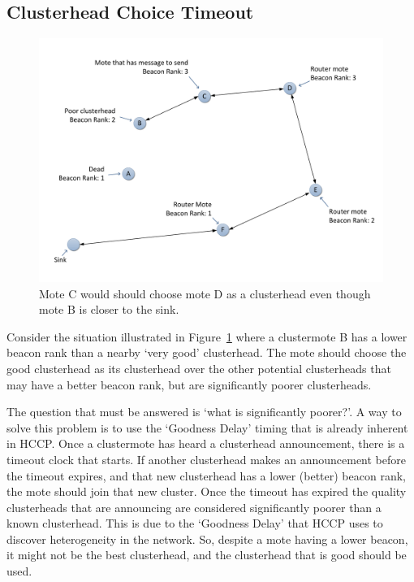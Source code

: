 \subsection{Clusterhead Choice Timeout}
\begin{figure}[tb]
	\centering
		\includegraphics[width=\textwidth]{images/clusterheadChoice/BetterChooseWorseSometimes.pdf}
	\caption{Mote C would should choose mote D as a clusterhead even though mote B is closer to the sink. }
	\label{fig:image_chooseWorse}
\end{figure}



Consider the situation illustrated in Figure~\ref{fig:image_chooseWorse} where a clustermote B has a lower beacon rank than a nearby `very good' clusterhead.
The mote should choose the good clusterhead as its clusterhead over the other potential clusterheads
that may have a better beacon rank, but are significantly poorer clusterheads. 

The question that must be answered is `what is significantly poorer?'. A way to solve this problem is to use
the `Goodness Delay' timing that is already inherent in HCCP. Once a clustermote has heard a clusterhead announcement, there is a
timeout clock that starts. If another clusterhead makes an announcement before the timeout expires, and that new clusterhead 
has a lower (better) beacon rank, the mote should join that new cluster. Once the timeout has expired the quality clusterheads
that are announcing are considered significantly poorer than a known clusterhead. This is due to the `Goodness Delay' that HCCP 
uses to discover heterogeneity in the network. So, despite a mote having a lower beacon, it might not be the best clusterhead, and the 
clusterhead that is good should be used.


